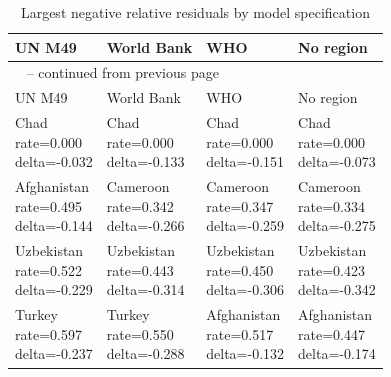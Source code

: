 \documentclass[runningheads]{llncs}
\begin{document}
{\begin{longtable}{p{}p{}p{}p{}}
\caption{Largest negative relative residuals by model specification}\label{tab:appendix-relative-residuals-negative}\\
\hline
UN M49 & World Bank & WHO & No region \\
\hline
\endfirsthead
\multicolumn{4}{l}{\tablename\ \thetable{} -- continued from previous page}\\
\hline
UN M49 & World Bank & WHO & No region \\
\hline
\endhead
\shortstack[l]{Chad\\ rate=0.000\\ delta=-0.032} &\shortstack[l]{Chad\\ rate=0.000\\ delta=-0.133} &\shortstack[l]{Chad\\ rate=0.000\\ delta=-0.151} &\shortstack[l]{Chad\\ rate=0.000\\ delta=-0.073} \\
\hline
\shortstack[l]{Afghanistan\\ rate=0.495\\ delta=-0.144} &\shortstack[l]{Cameroon\\ rate=0.342\\ delta=-0.266} &\shortstack[l]{Cameroon\\ rate=0.347\\ delta=-0.259} &\shortstack[l]{Cameroon\\ rate=0.334\\ delta=-0.275} \\
\hline
\shortstack[l]{Uzbekistan\\ rate=0.522\\ delta=-0.229} &\shortstack[l]{Uzbekistan\\ rate=0.443\\ delta=-0.314} &\shortstack[l]{Uzbekistan\\ rate=0.450\\ delta=-0.306} &\shortstack[l]{Uzbekistan\\ rate=0.423\\ delta=-0.342} \\
\hline
\shortstack[l]{Turkey\\ rate=0.597\\ delta=-0.237} &\shortstack[l]{Turkey\\ rate=0.550\\ delta=-0.288} &\shortstack[l]{Afghanistan\\ rate=0.517\\ delta=-0.132} &\shortstack[l]{Afghanistan\\ rate=0.447\\ delta=-0.174} \\

\end{longtable}}
\end{document}
